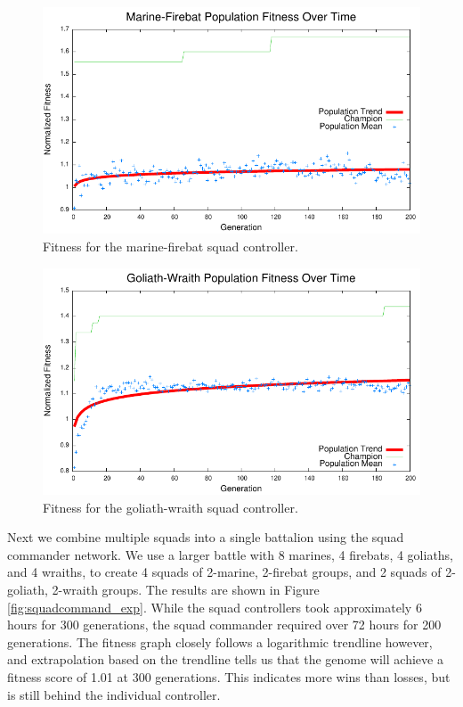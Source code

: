 \documentclass[10pt,a4paper,twocolumn]{article}
\begin{document}
\begin{figure}
\centering
\includegraphics[scale=.59]{plots/squad_mf.pdf}
\caption{Fitness for the marine-firebat squad controller.}
\label{fig:squad_mf_exp}
\end{figure}

\begin{figure}
\centering
\includegraphics[scale=.59]{plots/squad_gw.pdf}
\caption{Fitness for the goliath-wraith squad controller.}
\label{fig:squad_gw_exp}
\end{figure}

Next we combine multiple squads into a single battalion using the squad commander network. We use a larger battle with 8 marines, 4 firebats, 4 goliaths, and 4 wraiths, to create 4 squads of 2-marine, 2-firebat groups, and 2 squads of 2-goliath, 2-wraith groups. The results are shown in Figure \ref{fig:squadcommand_exp}. While the squad controllers took approximately 6 hours for 300 generations, the squad commander required over 72 hours for 200 generations. The fitness graph closely follows a logarithmic trendline however, and extrapolation based on the trendline tells us that the genome will achieve a fitness score of 1.01 at 300 generations. This indicates more wins than losses, but is still behind the individual controller.
\end{document}
